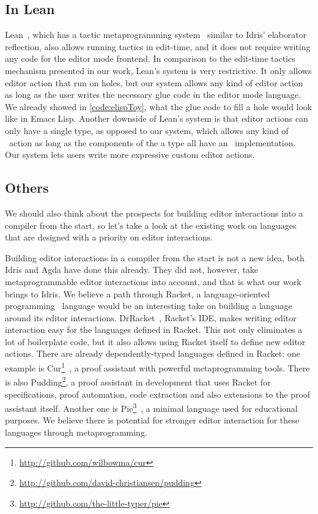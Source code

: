 \subsection{In Lean}

Lean~\cite{lean}, which has a tactic metaprogramming system~\cite{leanmeta}
similar to Idris' elaborator reflection, also allows running tactics in
edit-time, and it does not require writing any code for the editor mode
frontend.
In comparison to the edit-time tactics mechanism presented in our work, Lean's
system is very restrictive. It only allows editor action that run on holes, but
our system allows any kind of editor action as long as the user writes the
necessary glue code in the editor mode language. We already showed in
\autoref{code:elispToy}, what the glue code to fill a hole would look like in
Emacs Lisp. Another downside of Lean's system is that editor actions can only
have a single type, as opposed to our system, which allows any kind of
\Elab\ action as long as the components of the a type all have an
\Editorable\ implementation. Our system lets users write more expressive custom
editor actions.

\subsection{Others}

We should also think about the prospects for building editor interactions into
a compiler from the start, so let's take a look at the existing work on
languages that are designed with a priority on editor interactions.

Building editor interactions in a compiler from the start is not a new idea,
both Idris and Agda have done this already. They did not, however, take
metaprogrammable editor interactions into account, and that is what our work
brings to Idris. We believe a path through Racket, a language-oriented
programming~\cite{racketManifesto, feltey2016languages} language would be an
interesting take on building a language around its editor interactions.
DrRacket~\cite{drracket}, Racket's IDE, makes writing editor interaction easy
for the languages defined in Racket. This not only eliminates a lot of
boilerplate code, but it also allows using Racket itself to define new editor
actions. There are already dependently-typed languages defined in Racket: one
example is Cur\footnote{\url{http://github.com/wilbowma/cur}}~\cite{cur}, a proof assistant with
powerful metaprogramming tools. There is also Pudding\footnote{\url{http://github.com/david-christiansen/pudding}}, a proof assistant in
development that uses Racket for specifications, proof automation, code
extraction and also extensions to the proof assistant itself.
Another one is Pie\footnote{\url{http://github.com/the-little-typer/pie}}~\cite{theLittleTyper}, a
minimal language used for educational purposes.
We believe there is potential
for stronger editor interaction for these languages through metaprogramming.

